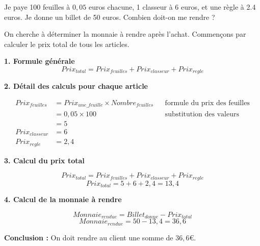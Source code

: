 \documentclass[answers]{exam}
\begin{document}
\begin{questions}
  \question Je paye 100 feuilles à $0,05$ euros chacune, 1 classeur à 6 euros, et une règle à 2.4 euros. Je donne un billet de 50 euros.  
  Combien doit-on me rendre ?
\end{questions}

\begin{solution}

On cherche à déterminer la monnaie à rendre après l’achat.  
Commençons par calculer le prix total de tous les articles.

\bigskip
\textbf{1. Formule générale}
\[
Prix_{total} = Prix_{feuilles} + Prix_{classeur} + Prix_{regle}
\]

\bigskip
\textbf{2. Détail des calculs pour chaque article}

\begin{align*}
Prix_{feuilles} &= Prix_{une\_feuille} \times Nombre_{feuilles} && \text{formule du prix des feuilles}\\
                &= 0,05 \times 100 && \text{substitution des valeurs}\\
                &= 5\\[6pt]
Prix_{classeur} &= 6\\[6pt]
Prix_{regle} &= 2,4
\end{align*}

\bigskip
\textbf{3. Calcul du prix total}

\[
Prix_{total} = Prix_{feuilles} + Prix_{classeur} + Prix_{regle}
\]
\[
Prix_{total} = 5 + 6 + 2,4 = 13,4
\]

\bigskip
\textbf{4. Calcul de la monnaie à rendre}

\[
Monnaie_{rendue} = Billet_{donne} - Prix_{total}
\]
\[
Monnaie_{rendue} = 50 - 13,4 = 36,6
\]

\bigskip
\textbf{Conclusion :}  
On doit rendre au client une somme de \(36,6\)€.
\end{solution}
\end{document}
